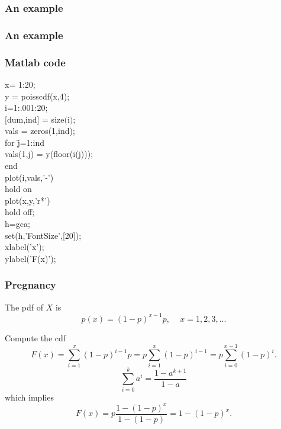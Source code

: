 \begin{frame}[fragile]\frametitle{An example}


\end{frame}


\begin{frame}[fragile]\frametitle{An example}


\end{frame}




\begin{frame}[fragile]\frametitle{Matlab code}

{\tiny
\begin{tabbing}
x= 1:20;\\
y = poisscdf(x,4);\\
i=1:.001:20;\\
$[$dum,ind$]$ = size$($i$)$;\\
vals = zeros(1,ind);\\
for \= j=1:ind \\
\>  vals(1,j) = y(floor(i(j))); \\
end \\

plot(i,vals,'-') \\
hold on \\
plot(x,y,'r*') \\
hold off;  \\

h=gca; \\
set(h,'FontSize',[20]); \\
xlabel('x'); \\
ylabel('F(x)');  \\


\end{tabbing}
}
\end{frame}



\begin{frame}[fragile]\frametitle{Pregnancy}

The pdf of $X$ is
$$p(x) = (1-p)^{x-1}p, \, \, \, \, \, \, \, x=1,2,3,...$$ 

\vspace{.1in}
Compute the cdf
$$F(x) = \sum_{i=1}^x (1-p)^{i-1}p=p\sum_{i=1}^x (1-p)^{i-1} = p
\sum_{i=0}^{x-1} (1-p)^{i}.$$
$$\sum_{i=0}^k a^i = \frac{1-a^{k+1}}{1-a}$$
which implies
$$F(x) = p\frac{1-(1-p)^x}{1-(1-p)} = 1-(1-p)^x.$$


\end{frame}



